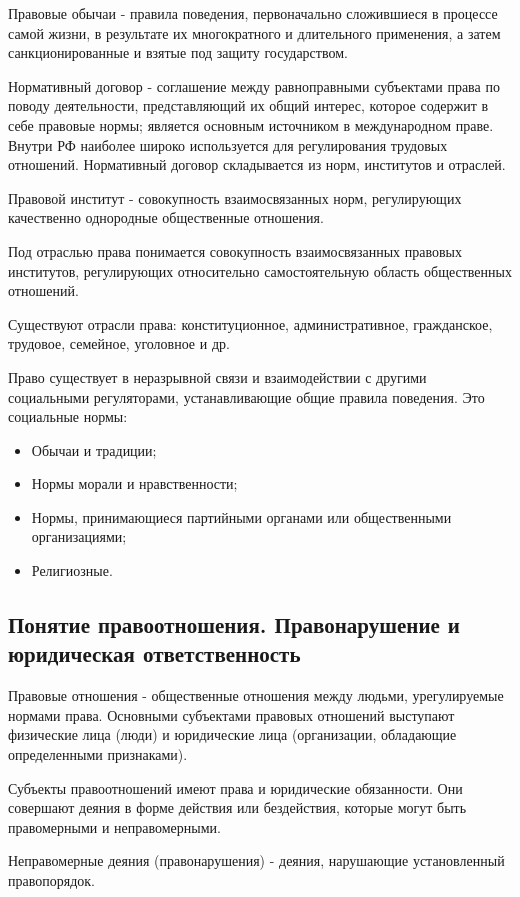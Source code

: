Правовые обычаи - правила поведения, первоначально сложившиеся в процессе самой жизни, в результате их многократного и длительного применения, а затем санкционированные и взятые под защиту государством.

Нормативный договор - соглашение между равноправными субъектами права по поводу деятельности, представляющий их общий интерес, которое содержит в себе правовые нормы; является основным источником в международном праве. Внутри РФ наиболее широко используется для регулирования трудовых отношений. Нормативный договор складывается из норм, институтов и отраслей.

Правовой институт - совокупность взаимосвязанных норм, регулирующих качественно однородные общественные отношения.

Под отраслью права понимается совокупность взаимосвязанных правовых институтов, регулирующих относительно самостоятельную область общественных отношений.

Существуют отрасли права: конституционное, административное, гражданское, трудовое, семейное, уголовное и др.

Право существует в неразрывной связи и взаимодействии с другими социальными регуляторами, устанавливающие общие правила поведения. Это социальные нормы:
\begin{itemize}
	\item Обычаи и традиции;
	\item Нормы морали и нравственности;
	\item Нормы, принимающиеся партийными органами или общественными организациями;
	\item Религиозные.
\end{itemize}

\subsection{Понятие правоотношения. Правонарушение и юридическая ответственность}

Правовые отношения - общественные отношения между людьми, урегулируемые нормами права. Основными субъектами правовых отношений выступают физические лица (люди) и юридические лица (организации, обладающие определенными признаками).

Субъекты правоотношений имеют права и юридические обязанности. Они совершают деяния в форме действия или бездействия, которые могут быть правомерными и неправомерными.

Неправомерные деяния (правонарушения) - деяния, нарушающие установленный правопорядок.

